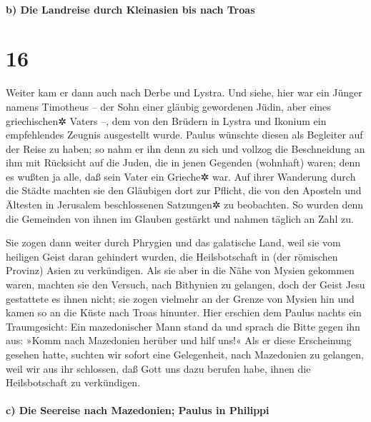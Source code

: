 \hypertarget{b-die-landreise-durch-kleinasien-bis-nach-troas}{%
\paragraph{b) Die Landreise durch Kleinasien bis nach
Troas}\label{b-die-landreise-durch-kleinasien-bis-nach-troas}}

\hypertarget{section-15}{%
\section{16}\label{section-15}}

 Weiter kam er dann auch nach Derbe und Lystra. Und siehe,
hier war ein Jünger namens Timotheus -- der Sohn einer gläubig
gewordenen Jüdin, aber eines griechischen✲ Vaters --,  dem
von den Brüdern in Lystra und Ikonium ein empfehlendes Zeugnis
ausgestellt wurde.  Paulus wünschte diesen als Begleiter
auf der Reise zu haben; so nahm er ihn denn zu sich und vollzog die
Beschneidung an ihm mit Rücksicht auf die Juden, die in jenen Gegenden
(wohnhaft) waren; denn es wußten ja alle, daß sein Vater ein Grieche✲
war.  Auf ihrer Wanderung durch die Städte machten sie den
Gläubigen dort zur Pflicht, die von den Aposteln und Ältesten in
Jerusalem beschlossenen Satzungen✲ zu beobachten.  So
wurden denn die Gemeinden von ihnen im Glauben gestärkt und nahmen
täglich an Zahl zu.

 Sie zogen dann weiter durch Phrygien und das galatische
Land, weil sie vom heiligen Geist daran gehindert wurden, die
Heilsbotschaft in (der römischen Provinz) Asien zu verkündigen.
 Als sie aber in die Nähe von Mysien gekommen waren,
machten sie den Versuch, nach Bithynien zu gelangen, doch der Geist Jesu
gestattete es ihnen nicht;  sie zogen vielmehr an der
Grenze von Mysien hin und kamen so an die Küste nach Troas hinunter.
 Hier erschien dem Paulus nachts ein Traumgesicht: Ein
mazedonischer Mann stand da und sprach die Bitte gegen ihn aus: »Komm
nach Mazedonien herüber und hilf uns!«  Als er diese
Erscheinung gesehen hatte, suchten wir sofort eine Gelegenheit, nach
Mazedonien zu gelangen, weil wir aus ihr schlossen, daß Gott uns dazu
berufen habe, ihnen die Heilsbotschaft zu verkündigen.

\hypertarget{c-die-seereise-nach-mazedonien-paulus-in-philippi}{%
\paragraph{c) Die Seereise nach Mazedonien; Paulus in
Philippi}\label{c-die-seereise-nach-mazedonien-paulus-in-philippi}}

